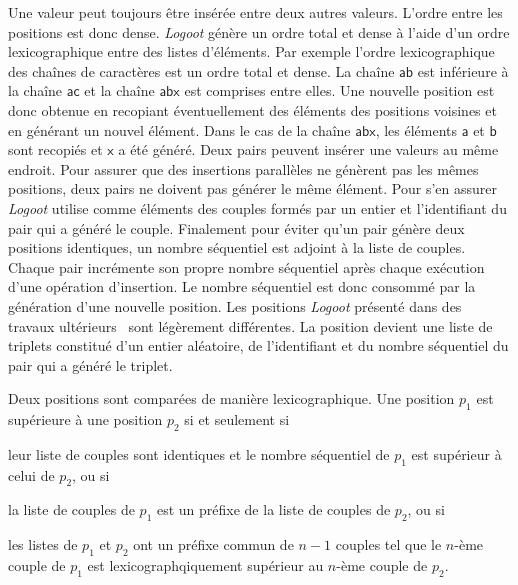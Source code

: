 Une valeur peut toujours être insérée entre deux autres valeurs.
L'ordre entre les positions est donc dense.
\emph{Logoot} génère un ordre total et dense à l'aide d'un ordre lexicographique entre des listes d'éléments.
Par exemple l'ordre lexicographique des chaînes de caractères est un ordre total et dense.
La chaîne $\textsf{ab}$ est inférieure à la chaîne $\textsf{ac}$ et la chaîne $\textsf{abx}$ est comprises entre elles.
Une nouvelle position est donc obtenue en recopiant éventuellement des éléments des positions voisines et en générant un nouvel élément.
Dans le cas de la chaîne $\textsf{abx}$, les éléments $\textsf{a}$ et $\textsf{b}$ sont recopiés et $\textsf{x}$ a été généré.
Deux pairs peuvent insérer une valeurs au même endroit.
Pour assurer que des insertions parallèles ne génèrent pas les mêmes positions, deux pairs ne doivent pas générer le même élément.
Pour s'en assurer \emph{Logoot} utilise comme éléments des couples formés par un entier et l'identifiant du pair qui a généré le couple.
Finalement pour éviter qu'un pair génère deux positions identiques, un nombre séquentiel est adjoint à la liste de couples.
Chaque pair incrémente son propre nombre séquentiel après chaque exécution d'une opération d'insertion.
Le nombre séquentiel est donc consommé par la génération d'une nouvelle position.
Les positions \emph{Logoot} présenté dans des travaux ultérieurs~\autocite{weiss2010logoot} sont légèrement différentes.
La position devient une liste de triplets constitué d'un entier aléatoire, de l'identifiant et du nombre séquentiel du pair qui a généré le triplet.

Deux positions sont comparées de manière lexicographique.
Une position $p_1$ est supérieure à une position $p_2$ si et seulement si \begin{inlinelist}\item leur liste de couples sont identiques et le nombre séquentiel de $p_1$ est supérieur à celui de $p_2$, ou si \item la liste de couples de $p_1$ est un préfixe de la liste de couples de $p_2$, ou si \item les listes de $p_1$ et $p_2$ ont un préfixe commun de $n-1$ couples tel que le $n$-ème couple de $p_1$ est lexicographqiquement supérieur au $n$-ème couple de $p_2$.\end{inlinelist}

